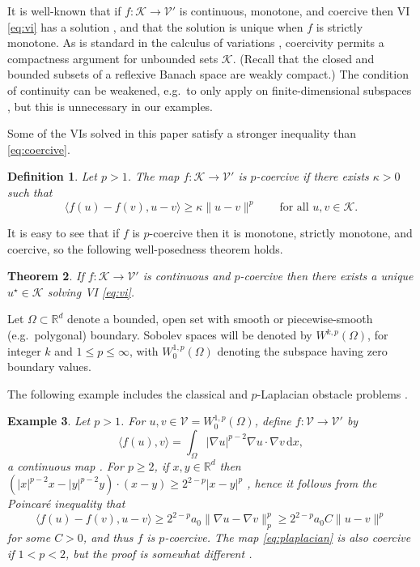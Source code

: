 \documentclass[letterpaper,final,12pt,reqno]{amsart}
\theoremstyle{cstyle}
\newtheorem{theorem}{Theorem}
\theoremstyle{cstyle*}
\theoremstyle{dstyle}
\newtheorem{definition}[theorem]{Definition}
\newtheorem{example}[theorem]{Example}
\numberwithin{equation}{section}
\numberwithin{figure}{section}
\numberwithin{table}{section}
\numberwithin{theorem}{section}
\newcommand{\RR}{\mathbb{R}}
\newcommand{\grad}{\nabla}
\newcommand{\cK}{\mathcal{K}}
\newcommand{\cV}{\mathcal{V}}
\newcommand{\ip}[2]{\langle#1,#2\rangle}
\newcommand{\dx}{\, \mathrm{d}x}
\begin{document}
It is well-known that if $f:\cK \to \cV'$ is continuous, monotone, and coercive then VI \eqref{eq:vi} has a solution \cite[Corollary III.1.8]{KinderlehrerStampacchia1980}, and that the solution is unique when $f$ is strictly monotone.  As is standard in the calculus of variations \cite{Evans2010}, coercivity permits a compactness argument for unbounded sets $\cK$.  (Recall that the closed and bounded subsets of a reflexive Banach space are weakly compact.)  The condition of continuity can be weakened, e.g.~to only apply on finite-dimensional subspaces \cite{KinderlehrerStampacchia1980}, but this is unnecessary in our examples.

Some of the VIs solved in this paper satisfy a stronger inequality than \eqref{eq:coercive}.

\begin{definition}  Let $p>1$.  The map $f:\cK \to \cV'$ is \emph{$p$-coercive} if there exists $\kappa>0$ such that
\begin{equation}
\ip{f(u)-f(v)}{u-v} \ge \kappa \|u-v\|^p \qquad \text{for all } u,v \in \cK. \label{eq:pcoercive}
\end{equation}
\end{definition}

It is easy to see that if $f$ is $p$-coercive then it is monotone, strictly monotone, and coercive, so the following well-posedness theorem holds.

\begin{theorem}  \label{thm:viwellposed}  If $f:\cK \to \cV'$ is continuous and $p$-coercive then there exists a unique $u^\star\in \cK$ solving VI \eqref{eq:vi}.
\end{theorem}

Let $\Omega \subset \RR^d$ denote a bounded, open set with smooth or piecewise-smooth (e.g.~polygonal) boundary.  Sobolev spaces \cite{Evans2010} will be denoted by $W^{k,p}(\Omega)$, for integer $k$ and $1\le p \le \infty$, with $W^{1,p}_0(\Omega)$ denoting the subspace having zero boundary values.

The following example includes the classical and $p$-Laplacian obstacle problems \cite{ChoeLewis1991}.

\begin{example}  \label{ex:plaplacian}  Let $p>1$.  For $u,v \in \cV = W^{1,p}_0(\Omega)$, define $f:\cV \to \cV'$ by
\begin{equation}
\ip{f(u)}{v} = \int_\Omega |\grad u|^{p-2} \grad u \cdot \grad v\dx, \label{eq:plaplacian}
\end{equation}
a continuous map \cite[Theorem A.0.6]{Peral1997}.  For $p\ge 2$, if $x,y\in\RR^d$ then $(|x|^{p-2} x - |y|^{p-2} y)\cdot (x-y) \ge 2^{2-p} |x-y|^p$ \cite[Appendix A]{Bueler2021conservation}, hence it follows from the Poincar\'e inequality that
    $$\ip{f(u) - f(v)}{u-v} \ge 2^{2-p} a_0 \|\grad u - \grad v\|_p^p \ge 2^{2-p} a_0 C \|u-v\|^p$$
for some $C>0$, and thus $f$ is $p$-coercive.  The map \eqref{eq:plaplacian} is also coercive if $1<p<2$, but the proof is somewhat different \cite[Theorem 4.4, for example]{Bueler2021conservation}.  \end{example}
\end{document}
